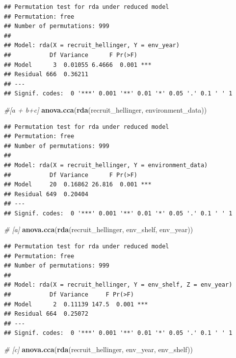 \documentclass[
]{article}
\newenvironment{Shaded}{\begin{snugshade}}{\end{snugshade}}
\newcommand{\CommentTok}[1]{\textcolor[rgb]{0.56,0.35,0.01}{\textit{#1}}}
\newcommand{\FunctionTok}[1]{\textcolor[rgb]{0.13,0.29,0.53}{\textbf{#1}}}
\newcommand{\NormalTok}[1]{#1}
\begin{document}
\begin{verbatim}
## Permutation test for rda under reduced model
## Permutation: free
## Number of permutations: 999
## 
## Model: rda(X = recruit_hellinger, Y = env_year)
##           Df Variance      F Pr(>F)    
## Model      3  0.01055 6.4666  0.001 ***
## Residual 666  0.36211                  
## ---
## Signif. codes:  0 '***' 0.001 '**' 0.01 '*' 0.05 '.' 0.1 ' ' 1
\end{verbatim}

\begin{Shaded}
\begin{Highlighting}[]
\CommentTok{\#[a + b+c]}
\FunctionTok{anova.cca}\NormalTok{(}\FunctionTok{rda}\NormalTok{(recruit\_hellinger, environment\_data))}
\end{Highlighting}
\end{Shaded}

\begin{verbatim}
## Permutation test for rda under reduced model
## Permutation: free
## Number of permutations: 999
## 
## Model: rda(X = recruit_hellinger, Y = environment_data)
##           Df Variance      F Pr(>F)    
## Model     20  0.16862 26.816  0.001 ***
## Residual 649  0.20404                  
## ---
## Signif. codes:  0 '***' 0.001 '**' 0.01 '*' 0.05 '.' 0.1 ' ' 1
\end{verbatim}

\begin{Shaded}
\begin{Highlighting}[]
\CommentTok{\# [a]}
\FunctionTok{anova.cca}\NormalTok{(}\FunctionTok{rda}\NormalTok{(recruit\_hellinger, env\_shelf, env\_year))}
\end{Highlighting}
\end{Shaded}

\begin{verbatim}
## Permutation test for rda under reduced model
## Permutation: free
## Number of permutations: 999
## 
## Model: rda(X = recruit_hellinger, Y = env_shelf, Z = env_year)
##           Df Variance     F Pr(>F)    
## Model      2  0.11139 147.5  0.001 ***
## Residual 664  0.25072                 
## ---
## Signif. codes:  0 '***' 0.001 '**' 0.01 '*' 0.05 '.' 0.1 ' ' 1
\end{verbatim}

\begin{Shaded}
\begin{Highlighting}[]
\CommentTok{\# [c]}
\FunctionTok{anova.cca}\NormalTok{(}\FunctionTok{rda}\NormalTok{(recruit\_hellinger, env\_year, env\_shelf))}
\end{Highlighting}
\end{Shaded}
\end{document}
